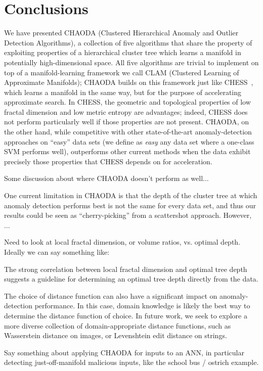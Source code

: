 \section{Conclusions}
\label{sec:conclusions}

We have presented CHAODA (Clustered Hierarchical Anomaly and Outlier Detection Algorithms), a collection of five algorithms that share the property of exploiting properties of a hierarchical cluster tree which learns a manifold in potentially high-dimensional space. All five algorithms are trivial to implement on top of a manifold-learning framework we call CLAM (Clustered Learning of Approximate Manifolds); CHAODA builds on this framework just like CHESS~\cite{ishaq2019entropy}, which learns a manifold in the same way, but for the purpose of accelerating approximate search. In CHESS, the geometric and topological properties of low fractal dimension and low metric entropy are advantages; indeed, CHESS does not perform particularly well if those properties are not present. CHAODA, on the other hand, while competitive with other state-of-the-art anomaly-detection approaches on ``easy'' data sets (we define as \textit{easy} any data set where a one-class SVM performs well), outperforms other current methods when the data exhibit precisely those properties that CHESS depends on for acceleration.


Some discussion about where CHAODA doesn't perform as well...

One current limitation in CHAODA is that the depth of the cluster tree at which anomaly detection performs best is not the same for every data set, and thus our results could be seen as ``cherry-picking'' from a scattershot approach. However, ...

Need to look at local fractal dimension, or volume ratios, vs. optimal depth. Ideally we can say something like:

The strong correlation between local fractal dimension and optimal tree depth suggests a guideline for determining an optimal tree depth directly from the data.

The choice of distance function can also have a significant impact on anomaly-detection performance. In this case, domain knowledge is likely the best way to determine the distance function of choice. In future work, we seek to explore a more diverse collection of domain-appropriate distance functions, such as Wasserstein distance on images, or Levenshtein edit distance on strings. 

Say something about applying CHAODA for inputs to an ANN, in particular detecting just-off-manifold malicious inputs, like the school bus / ostrich example.
